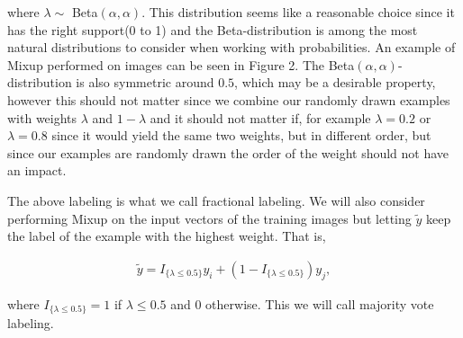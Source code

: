 \documentclass{article}
\begin{document}
where $\lambda \sim$ Beta$(\alpha, \alpha)$.
 This distribution seems like a 
reasonable choice since it has the right support(0 to 1) and the Beta-distribution is among the most natural distributions to
consider when working with probabilities. 
An example of Mixup performed on images can be seen in Figure 2.
The Beta$(\alpha, \alpha)$-distribution is also symmetric around $0.5$, which may be 
a desirable property, however this should not matter since we combine our randomly drawn examples with weights $\lambda$ and $1-\lambda$ and 
it should not matter if, for example $\lambda = 0.2$ or $\lambda = 0.8$ since it would yield the same two weights, but in different order, but 
since our examples are randomly drawn the order of the weight should not have an impact. 

% 

The above labeling is what we call fractional labeling.
We will also consider performing Mixup on the input vectors of the training images but letting $\tilde{y}$ keep the label of the example 
with the highest weight. That is,

\begin{align*}
\tilde{y} = I_{\{ \lambda \leq 0.5 \}} y_i + (1-I_{\{ \lambda \leq 0.5 \}}) y_j, 
\end{align*}

where $I_{\{ \lambda \leq 0.5 \}} = 1$ if $\lambda \leq 0.5$ and $0$ otherwise. This we will call majority vote labeling.
\end{document}
